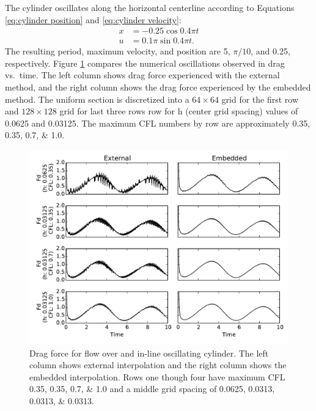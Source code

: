 \documentclass[preprint,12pt]{elsarticle}
\begin{document}
The cylinder oscillates along the horizontal centerline according to Equations \eqref{eq:cylinder position} and \eqref{eq:cylinder velocity}:
\begin{align}
x&=-0.25\cos{0.4\pi t}\label{eq:cylinder position}\\
u&=0.1\pi\sin{0.4\pi t}.\;\label{eq:cylinder velocity}
\end{align}
The resulting period, maximum velocity, and position are 5, $\pi/10$, and 0.25, respectively. 
Figure \ref{fig:osccylinder} compares the numerical oscillations observed in drag vs.~time. 
The left column shows drag force experienced with the external method, and the right column shows the drag force experienced by the embedded method.
The uniform section is discretized into a $64 \times 64$ grid for the first row and $ 128 \times 128$ grid for last three rows row for h (center grid spacing) values of 0.0625 and 0.03125. 
The maximum CFL numbers by row are approximately \numlist{0.35; 0.35; 0.7; 1.0}.
\begin{figure}[!htb]
	\centering
	\par\medskip
	\includegraphics[width=\textwidth]{osc_cylinder}
	\caption{Drag force for flow over and in-line oscillating cylinder. The left column shows external interpolation and the right column shows the embedded interpolation. Rows one though four have maximum CFL \numlist{0.35; 0.35; 0.7; 1.0} and a middle grid spacing of \numlist{0.0625; 0.0313; 0.0313; 0.0313}.}
	\label{fig:osccylinder}
\end{figure}
\end{document}
